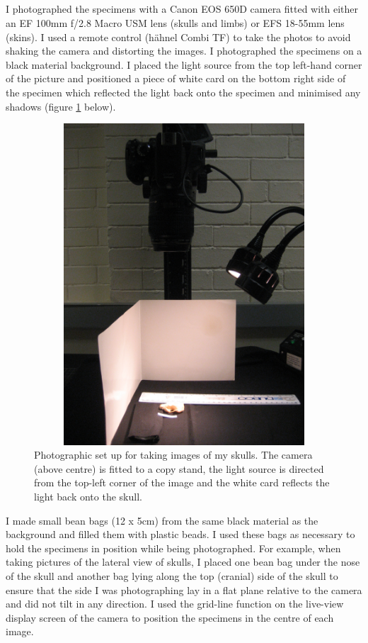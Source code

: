 \subsection{}
I photographed the specimens with a Canon EOS 650D camera fitted with either an EF 100mm f/2.8 Macro USM lens (skulls and limbs) or EFS 18-55mm lens (skins). I used a remote control (h\"ahnel Combi TF) to take the photos to avoid shaking the camera and distorting the images. I photographed the specimens on a black material background. I placed the light source from the top left-hand corner of the picture and positioned a piece of white card on the bottom right side of the specimen which reflected the light back onto the specimen and minimised any shadows (figure \ref{fig:camera} below).

\begin{figure}[h] 
  \centering
  \includegraphics[width=12cm, height=12cm, keepaspectratio=true]{Methods/figures/camera.jpg}
    \caption[Photographic set up]%
    {Photographic set up for taking images of my skulls. The camera (above centre) is fitted to a copy stand, the light source is directed from the top-left corner of the image and the white card reflects the light back onto the skull. }%
  \label{fig:camera}
  \end{figure}
I made small bean bags (12 x 5cm) from the same black material as the background and filled them with plastic beads. I used these bags as necessary to hold the specimens in position while being photographed. For example, when taking pictures of the lateral view of skulls, I placed one bean bag under the nose of the skull and another bag lying along the top (cranial) side of the skull to ensure that the side I was photographing lay in a flat plane relative to the camera and did not tilt in any direction. 
I used the grid-line function on the live-view display screen of the camera to position the specimens in the centre of each image. 

